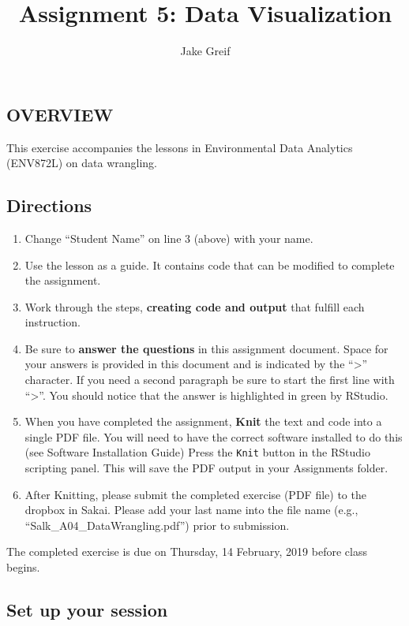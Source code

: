 \documentclass[]{article}
\title{Assignment 5: Data Visualization}
\author{Jake Greif}
\date{}
\providecommand{\tightlist}{%
  \setlength{\itemsep}{0pt}\setlength{\parskip}{0pt}}
\begin{document}
\maketitle

\subsection{OVERVIEW}\label{overview}

This exercise accompanies the lessons in Environmental Data Analytics
(ENV872L) on data wrangling.

\subsection{Directions}\label{directions}

\begin{enumerate}
\def\labelenumi{\arabic{enumi}.}
\tightlist
\item
  Change ``Student Name'' on line 3 (above) with your name.
\item
  Use the lesson as a guide. It contains code that can be modified to
  complete the assignment.
\item
  Work through the steps, \textbf{creating code and output} that fulfill
  each instruction.
\item
  Be sure to \textbf{answer the questions} in this assignment document.
  Space for your answers is provided in this document and is indicated
  by the ``\textgreater{}'' character. If you need a second paragraph be
  sure to start the first line with ``\textgreater{}''. You should
  notice that the answer is highlighted in green by RStudio.
\item
  When you have completed the assignment, \textbf{Knit} the text and
  code into a single PDF file. You will need to have the correct
  software installed to do this (see Software Installation Guide) Press
  the \texttt{Knit} button in the RStudio scripting panel. This will
  save the PDF output in your Assignments folder.
\item
  After Knitting, please submit the completed exercise (PDF file) to the
  dropbox in Sakai. Please add your last name into the file name (e.g.,
  ``Salk\_A04\_DataWrangling.pdf'') prior to submission.
\end{enumerate}

The completed exercise is due on Thursday, 14 February, 2019 before
class begins.

\subsection{Set up your session}\label{set-up-your-session}
\end{document}
